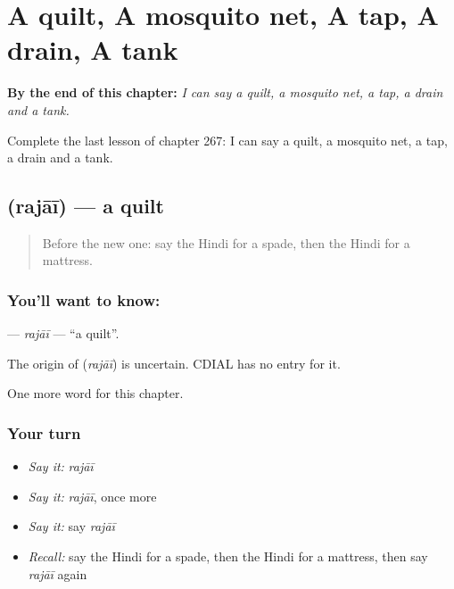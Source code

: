 
\chapter{A quilt, A mosquito net, A tap, A drain, A tank}
\label{ch:hi-a-quilt-a-mosquito-net-a-tap-a-drain-a-tank}

\begin{chapteropening}
\textbf{By the end of this chapter:} \emph{I can say a quilt, a mosquito net, a tap, a drain and a tank.}

Complete the last lesson of chapter 267: I can say a quilt, a mosquito net, a tap, a drain and a tank.
\end{chapteropening}

\section[\texorpdfstring{\hi{रजाई} (rajāī)}{रजाई (rajāī)}]{ (rajāī) — a quilt}

\label{lesson:HI-C267-rajai}



\begin{quote}
Before the new one: say the Hindi for a spade, then the Hindi for a mattress.
\end{quote}

\subsection*{You'll want to know: }
\textbf{} — \emph{rajāī} — \textquotedblleft{}a quilt\textquotedblright{}.

\begin{cousinweb}
The origin of \textbf{} (\emph{rajāī}) is uncertain. CDIAL has no entry for it.
\end{cousinweb}

\begin{grammarlens}[title={What you've built}]
One more word for this chapter.
\end{grammarlens}

\subsection*{Your turn}
\begin{itemize}
\raggedright
  \item \emph{Say it:} \emph{rajāī}
  \item \emph{Say it:} \emph{rajāī}, once more
  \item \emph{Say it:} say \emph{rajāī}
  \item \emph{Recall:} say the Hindi for a spade, then the Hindi for a mattress, then say \emph{rajāī} again
\end{itemize}


